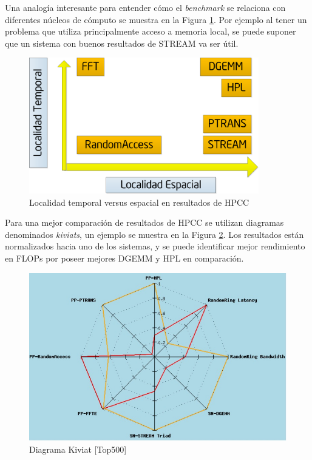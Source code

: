 \documentclass[a4paper]{report}
\begin{document}
\bigskip

Una analogía interesante para entender cómo el {\it benchmark} se relaciona con diferentes núcleos de cómputo se muestra en la Figura \ref{fig:locality}. Por ejemplo al tener un problema que utiliza principalmente acceso a memoria local, se puede suponer que un sistema con buenos resultados de STREAM va ser útil.

\begin{figure}[H]
\begin{center}
\includegraphics[width=10cm]{locality.png}
\caption{Localidad temporal versus espacial en resultados de HPCC}
\label{fig:locality}
\end{center}
\end{figure}

Para una mejor comparación de resultados de HPCC se utilizan diagramas
denominados {\it kiviats}, un ejemplo se muestra en la Figura \ref{fig:kiviat}.
Los resultados están normalizados hacia uno de los sistemas, y se puede identificar mejor rendimiento en FLOPs por poseer mejores DGEMM y HPL en comparación.

\begin{figure}[H]
\begin{center}
\includegraphics[width=12cm]{kiviat.png}
\caption{Diagrama Kiviat [Top500]}
\label{fig:kiviat}
\end{center}
\end{figure}
\end{document}
